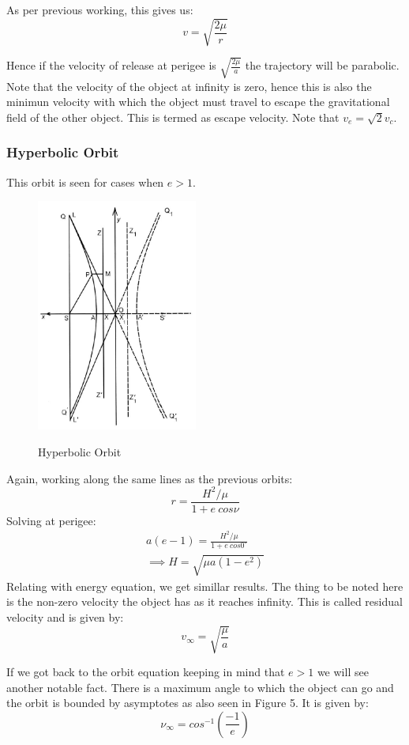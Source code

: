 \documentclass[12pt, letterpaper]{article}
\begin{document}
As per previous working, this gives us:
\[ v = \sqrt{\frac{2\mu}{r}} \]

Hence if the velocity of release at perigee is $\sqrt{\frac{2\mu}{a}}$ the trajectory will be parabolic. Note that the velocity of the object at infinity is zero, hence this is also the minimun velocity with which the object must travel to escape the gravitational field of the other object. This is termed as escape velocity. Note that $v_e = \sqrt{2}v_c$.
\newpage
\subsubsection{Hyperbolic Orbit}
This orbit is seen for cases when $e>1$. 
\begin{figure}[ht]
	\centering
    \includegraphics[width = 200px]{hyperbola}
    \label{fig:hyperbola}
    \caption{Hyperbolic Orbit}
\end{figure}

Again, working along the same lines as the previous orbits:
\[ r = \frac{H^2/\mu}{1+e\:cos\nu} \]
Solving at perigee:
\begin{gather*}
	a(e-1) = \frac{H^2/\mu}{1+e\:cos0^\circ}\\
	\implies H = \sqrt{\mu a(1-e^2)}
\end{gather*}
Relating with energy equation, we get simillar results. The thing to be noted here is the non-zero velocity the object has as  it reaches infinity. This is called residual velocity and is given by:
\[ 
	v_\infty = \sqrt{\frac{\mu}{a}}
\]

If we got back to the orbit equation keeping in mind that $e>1$ we will see another notable fact. There is a maximum angle to which the object can go and the orbit is bounded by asymptotes as also seen in Figure 5. It is given by:
\[
	\nu_\infty = cos^{-1}\left( \frac{-1}{e} \right)
\]
\end{document}
